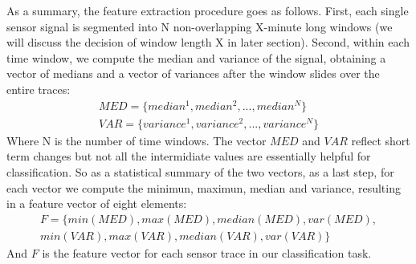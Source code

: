 As a summary, the feature extraction procedure goes as follows. First, each single sensor signal is segmented into N
non-overlapping X-minute long windows (we will discuss the decision of window length X in later section). Second, within
each time window, we compute the median and variance of the signal, obtaining a vector of medians and a vector of
variances after the window slides over the entire traces: 
\begin{displaymath}
\begin{split}
MED = \{median^{1}, median^{2}, ..., median^{N}\}\\
VAR = \{variance^{1}, variance^{2}, ..., variance^{N}\}
\end{split}
\end{displaymath}
Where N is the number of time windows. The vector $MED$ and $VAR$ reflect short term changes but not all the intermidiate values are essentially helpful for classification. So as a statistical summary of the two vectors, as a last step, for each vector we compute the minimun, maximun, median and variance, resulting in a feature vector of eight elements:
\begin{displaymath}
\begin{split}
F = \{min(MED), max(MED), median(MED), var(MED),\\
 min(VAR), max(VAR), median(VAR), var(VAR)\}
\end{split}
\end{displaymath}
And $F$ is the feature vector for each sensor trace in our classification task.

